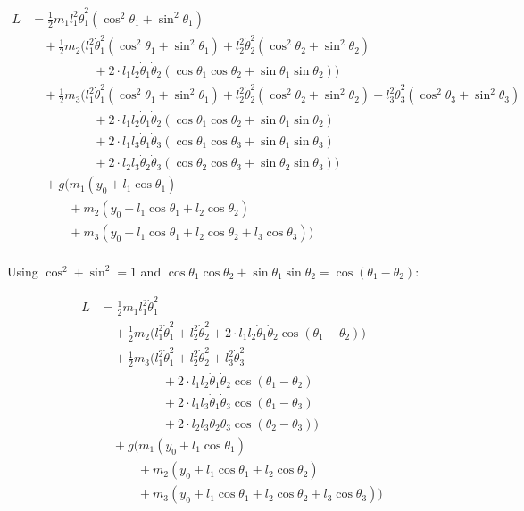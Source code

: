 \documentclass[11pt,a4paper]{article}
\begin{document}
\begin{align*}
L &= \frac{1}{2} m_1 l_1^2 \dot{\theta}_1^2 \left( \cos^2\theta_1 + \sin^2\theta_1 \right) \\
    &\quad + \frac{1}{2} m_2 \big( l_1^2 \dot{\theta}_1^2 (\cos^2\theta_1 + \sin^2\theta_1) + l_2^2 \dot{\theta}_2^2 (\cos^2\theta_2 + \sin^2\theta_2) \\
        &\qquad\qquad\quad + 2 \cdot l_1 l_2 \dot{\theta}_1 \dot{\theta}_2 (\cos\theta_1 \cos\theta_2 + \sin\theta_1 \sin\theta_2) \big) \\
    &\quad + \frac{1}{2} m_3 \big( l_1^2 \dot{\theta}_1^2 (\cos^2\theta_1 + \sin^2\theta_1) + l_2^2 \dot{\theta}_2^2 (\cos^2\theta_2 + \sin^2\theta_2) + l_3^2 \dot{\theta}_3^2 (\cos^2\theta_3 + \sin^2\theta_3) \\
        &\qquad\qquad\quad + 2 \cdot l_1 l_2 \dot{\theta}_1 \dot{\theta}_2 (\cos\theta_1 \cos\theta_2 + \sin\theta_1 \sin\theta_2) \\
        &\qquad\qquad\quad + 2 \cdot l_1 l_3 \dot{\theta}_1 \dot{\theta}_3 (\cos\theta_1 \cos\theta_3 + \sin\theta_1 \sin\theta_3) \\
        &\qquad\qquad\quad + 2 \cdot l_2 l_3 \dot{\theta}_2 \dot{\theta}_3 (\cos\theta_2 \cos\theta_3 + \sin\theta_2 \sin\theta_3) \big) \\
    &\quad + g \big( m_1 (y_0 + l_1 \cos\theta_1) \\
        &\qquad\quad + m_2 (y_0 + l_1 \cos\theta_1 + l_2 \cos\theta_2) \\
        &\qquad\quad + m_3 (y_0 + l_1 \cos\theta_1 + l_2 \cos\theta_2 + l_3 \cos\theta_3) \big)
\end{align*}
\\
Using $\cos^2 + \sin^2 = 1$ and $\cos\theta_1 \cos\theta_2 + \sin\theta_1 \sin\theta_2 = \cos(\theta_1 - \theta_2)$:

\begin{align*}
L &= \frac{1}{2} m_1 l_1^2 \dot{\theta}_1^2 \\
    &\quad + \frac{1}{2} m_2 \big( l_1^2 \dot{\theta}_1^2 + l_2^2 \dot{\theta}_2^2 + 2 \cdot l_1 l_2 \dot{\theta}_1 \dot{\theta}_2 \cos(\theta_1 - \theta_2) \big) \\
    &\quad + \frac{1}{2} m_3 \big( l_1^2 \dot{\theta}_1^2 + l_2^2 \dot{\theta}_2^2 + l_3^2 \dot{\theta}_3^2 \\
        &\qquad\qquad\quad + 2 \cdot l_1 l_2 \dot{\theta}_1 \dot{\theta}_2 \cos(\theta_1 - \theta_2) \\
        &\qquad\qquad\quad + 2 \cdot l_1 l_3 \dot{\theta}_1 \dot{\theta}_3 \cos(\theta_1 - \theta_3) \\
        &\qquad\qquad\quad + 2 \cdot l_2 l_3 \dot{\theta}_2 \dot{\theta}_3 \cos(\theta_2 - \theta_3) \big) \\
    &\quad + g \big( m_1 (y_0 + l_1 \cos\theta_1) \\
        &\qquad\quad + m_2 (y_0 + l_1 \cos\theta_1 + l_2 \cos\theta_2) \\
        &\qquad\quad + m_3 (y_0 + l_1 \cos\theta_1 + l_2 \cos\theta_2 + l_3 \cos\theta_3) \big)
\end{align*}
\end{document}
